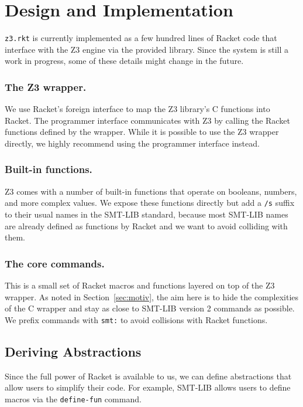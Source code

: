 \section{Design and Implementation}
\label{sec:design-impl}

\texttt{z3.rkt} is currently implemented as a few hundred lines of Racket code
that interface with the Z3 engine via the provided library. Since the system is
still a work in progress, some of these details might change in the future.

\subsubsection{The Z3 wrapper.} We use Racket's foreign interface \cite{racket/foreign}
to map the Z3 library's C functions into Racket. The programmer interface
communicates with Z3 by calling the Racket functions defined by the
wrapper. While it is possible to use the Z3 wrapper directly, we highly
recommend using the programmer interface instead.



\subsubsection{Built-in functions.} Z3 comes with a number of built-in functions that
operate on booleans, numbers, and more complex values. We expose these
functions directly but add a \texttt{/s} suffix to their usual names in the
SMT-LIB standard, because most SMT-LIB names are already defined as functions
by Racket and we want to avoid colliding with them.

\subsubsection{The core commands.} This is a small set of Racket macros and functions
layered on top of the Z3 wrapper. As noted in Section~\ref{sec:motiv}, the aim
here is to hide the complexities of the C wrapper and stay as close to SMT-LIB
version 2 commands \cite{smtlib2:10} as possible. We prefix commands with
\texttt{smt:} to avoid collisions with Racket functions.

\subsection{Deriving Abstractions}
\label{sec:derived}

Since the full power of Racket is available to us, we can define abstractions
that allow users to simplify their code. For example, SMT-LIB allows users to
define macros via the \texttt {define-fun} command.


